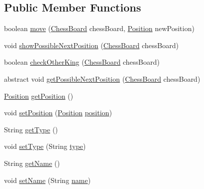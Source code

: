 \subsection*{Public Member Functions}
\begin{DoxyCompactItemize}
\item 
boolean \hyperlink{classmodel_chess_pieces_1_1_chess_piece_a12d4674577ac125df63eb022cd02e5e9}{move} (\hyperlink{classmodel_core_1_1_chess_board}{Chess\+Board} chess\+Board, \hyperlink{classmodel_core_1_1_position}{Position} new\+Position)
\item 
void \hyperlink{classmodel_chess_pieces_1_1_chess_piece_a2be89ce9b9a6affec1d5fd9df990d386}{show\+Possible\+Next\+Position} (\hyperlink{classmodel_core_1_1_chess_board}{Chess\+Board} chess\+Board)
\item 
boolean \hyperlink{classmodel_chess_pieces_1_1_chess_piece_a4c3f413337032a7328d0f06edca6fdcd}{check\+Other\+King} (\hyperlink{classmodel_core_1_1_chess_board}{Chess\+Board} chess\+Board)
\item 
abstract void \hyperlink{classmodel_chess_pieces_1_1_chess_piece_a3f9b600bf3206059f4a4b5542c5a5706}{get\+Possible\+Next\+Position} (\hyperlink{classmodel_core_1_1_chess_board}{Chess\+Board} chess\+Board)
\item 
\hyperlink{classmodel_core_1_1_position}{Position} \hyperlink{classmodel_chess_pieces_1_1_chess_piece_a6e88271516d06a50162a36321d10ff0e}{get\+Position} ()
\item 
void \hyperlink{classmodel_chess_pieces_1_1_chess_piece_abdd69cca4ca429e531ab58297c0036c7}{set\+Position} (\hyperlink{classmodel_core_1_1_position}{Position} \hyperlink{classmodel_chess_pieces_1_1_chess_piece_a3d4362d5b28f6edb14161196d9c6807d}{position})
\item 
String \hyperlink{classmodel_chess_pieces_1_1_chess_piece_a189d923d883085ce16d051c161c93e68}{get\+Type} ()
\item 
void \hyperlink{classmodel_chess_pieces_1_1_chess_piece_a7d2fa4377c4409371487f3e5afd5e100}{set\+Type} (String \hyperlink{classmodel_chess_pieces_1_1_chess_piece_a195487ca88c197af7c1604247be31db2}{type})
\item 
String \hyperlink{classmodel_chess_pieces_1_1_chess_piece_ac73d3ae34142cdbf7571a086ffb122c9}{get\+Name} ()
\item 
void \hyperlink{classmodel_chess_pieces_1_1_chess_piece_a86e3e4135360b5bdc7ce9f6bad817b99}{set\+Name} (String \hyperlink{classmodel_chess_pieces_1_1_chess_piece_a03d2fb76fbbff0dab72d00f2173a69ff}{name})
\end{DoxyCompactItemize}
